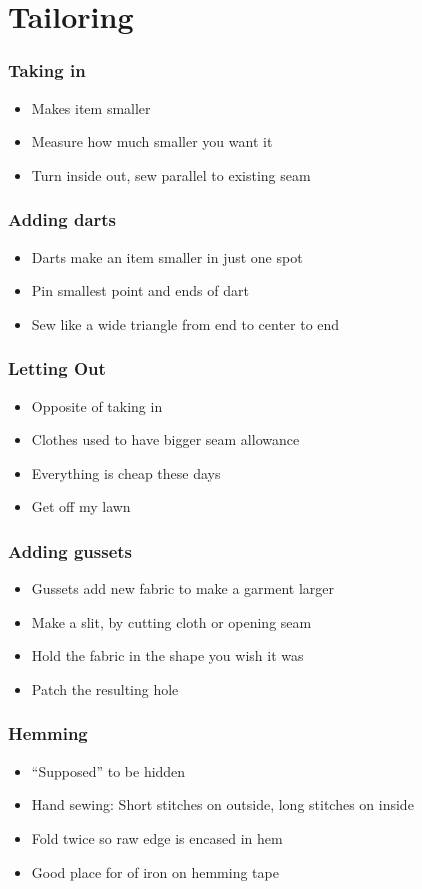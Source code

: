 \documentclass{beamer}
\begin{document}
\section{Tailoring}

\begin{frame}[fragile]
\frametitle{Taking in}
\begin{itemize}[<+(1)->]
\item Makes item smaller
\item Measure how much smaller you want it
\item Turn inside out, sew parallel to existing seam
\end{itemize}
\end{frame}

\begin{frame}[fragile]
\frametitle{Adding darts}
\begin{itemize}[<+(1)->]
\item Darts make an item smaller in just one spot
\item Pin smallest point and ends of dart
\item Sew like a wide triangle from end to center to end
\end{itemize}
\end{frame}

\begin{frame}[fragile]
\frametitle{Letting Out}
\begin{itemize}[<+(1)->]
\item Opposite of taking in
\item Clothes used to have bigger seam allowance
\item Everything is cheap these days
\item Get off my lawn
\end{itemize}
\end{frame}

\begin{frame}[fragile]
\frametitle{Adding gussets}
\begin{itemize}[<+(1)->]
\item Gussets add new fabric to make a garment larger
\item Make a slit, by cutting cloth or opening seam
\item Hold the fabric in the shape you wish it was
\item Patch the resulting hole
\end{itemize}
\end{frame}

\begin{frame}[fragile]
\frametitle{Hemming}
\begin{itemize}[<+(1)->]
\item ``Supposed'' to be hidden
\item Hand sewing: Short stitches on outside, long stitches on inside
\item Fold twice so raw edge is encased in hem
\item Good place for of iron on hemming tape
\end{itemize}
\end{frame}
\end{document}
